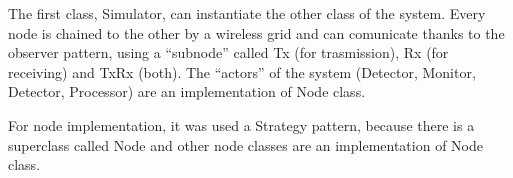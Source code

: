 \documentclass[a4paper,titlepage]{article}
\begin{document}
The first class, Simulator, can instantiate the other class of the system. Every node is chained to the other by a wireless grid and can comunicate thanks to the observer pattern, using a ``subnode'' called Tx (for trasmission), Rx (for receiving) and TxRx (both). The ``actors'' of the system (Detector, Monitor, Detector, Processor) are an implementation of Node class.

For node implementation, it was used a Strategy pattern, because there is a superclass called Node and other node classes are an implementation of Node class.
\end{document}
